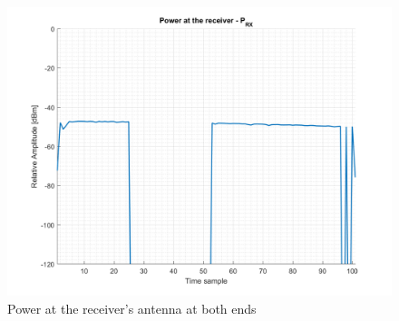 \begin{figure}[H]
	\centering
	\includegraphics[scale=0.8]{figures/s4_power.png}
	\caption{Power at the receiver's antenna at both ends}
	\label{fig:s4_power}
\end{figure}